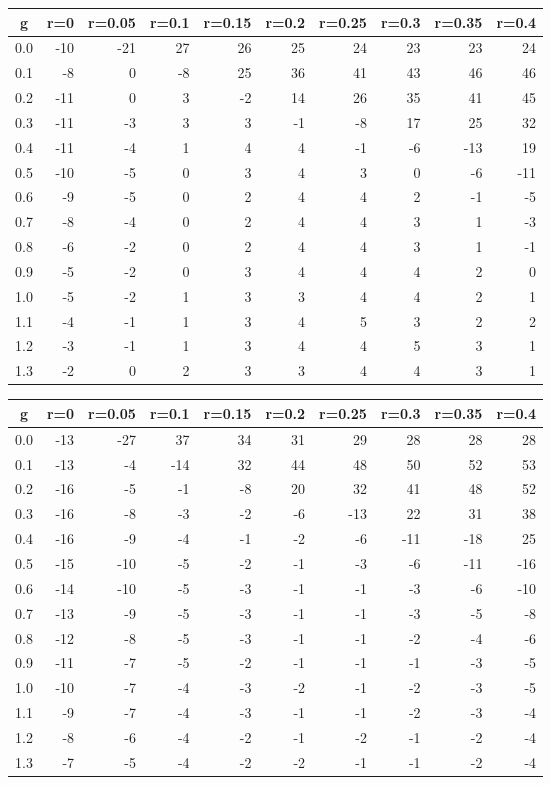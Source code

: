 %
\begin{table}[!tbp]
 \begin{center}
 \begin{tabular}{rrrrrrrrrr}\hline\hline
\multicolumn{1}{c}{g}&\multicolumn{1}{c}{r=0}&\multicolumn{1}{c}{r=0.05}&\multicolumn{1}{c}{r=0.1}&\multicolumn{1}{c}{r=0.15}&\multicolumn{1}{c}{r=0.2}&\multicolumn{1}{c}{r=0.25}&\multicolumn{1}{c}{r=0.3}&\multicolumn{1}{c}{r=0.35}&\multicolumn{1}{c}{r=0.4}\tabularnewline
\hline
0.0&-10&-21&27&26&25&24&23& 23& 24\tabularnewline
0.1& -8&  0&-8&25&36&41&43& 46& 46\tabularnewline
0.2&-11&  0& 3&-2&14&26&35& 41& 45\tabularnewline
0.3&-11& -3& 3& 3&-1&-8&17& 25& 32\tabularnewline
0.4&-11& -4& 1& 4& 4&-1&-6&-13& 19\tabularnewline
0.5&-10& -5& 0& 3& 4& 3& 0& -6&-11\tabularnewline
0.6& -9& -5& 0& 2& 4& 4& 2& -1& -5\tabularnewline
0.7& -8& -4& 0& 2& 4& 4& 3&  1& -3\tabularnewline
0.8& -6& -2& 0& 2& 4& 4& 3&  1& -1\tabularnewline
0.9& -5& -2& 0& 3& 4& 4& 4&  2&  0\tabularnewline
1.0& -5& -2& 1& 3& 3& 4& 4&  2&  1\tabularnewline
1.1& -4& -1& 1& 3& 4& 5& 3&  2&  2\tabularnewline
1.2& -3& -1& 1& 3& 4& 4& 5&  3&  1\tabularnewline
1.3& -2&  0& 2& 3& 3& 4& 4&  3&  1\tabularnewline
\hline
\end{tabular}

\end{center}

\end{table}

%
\begin{table}[!tbp]
 \begin{center}
 \begin{tabular}{rrrrrrrrrr}\hline\hline
\multicolumn{1}{c}{g}&\multicolumn{1}{c}{r=0}&\multicolumn{1}{c}{r=0.05}&\multicolumn{1}{c}{r=0.1}&\multicolumn{1}{c}{r=0.15}&\multicolumn{1}{c}{r=0.2}&\multicolumn{1}{c}{r=0.25}&\multicolumn{1}{c}{r=0.3}&\multicolumn{1}{c}{r=0.35}&\multicolumn{1}{c}{r=0.4}\tabularnewline
\hline
0.0&-13&-27& 37&34&31& 29& 28& 28& 28\tabularnewline
0.1&-13& -4&-14&32&44& 48& 50& 52& 53\tabularnewline
0.2&-16& -5& -1&-8&20& 32& 41& 48& 52\tabularnewline
0.3&-16& -8& -3&-2&-6&-13& 22& 31& 38\tabularnewline
0.4&-16& -9& -4&-1&-2& -6&-11&-18& 25\tabularnewline
0.5&-15&-10& -5&-2&-1& -3& -6&-11&-16\tabularnewline
0.6&-14&-10& -5&-3&-1& -1& -3& -6&-10\tabularnewline
0.7&-13& -9& -5&-3&-1& -1& -3& -5& -8\tabularnewline
0.8&-12& -8& -5&-3&-1& -1& -2& -4& -6\tabularnewline
0.9&-11& -7& -5&-2&-1& -1& -1& -3& -5\tabularnewline
1.0&-10& -7& -4&-3&-2& -1& -2& -3& -5\tabularnewline
1.1& -9& -7& -4&-3&-1& -1& -2& -3& -4\tabularnewline
1.2& -8& -6& -4&-2&-1& -2& -1& -2& -4\tabularnewline
1.3& -7& -5& -4&-2&-2& -1& -1& -2& -4\tabularnewline
\hline
\end{tabular}

\end{center}

\end{table}

